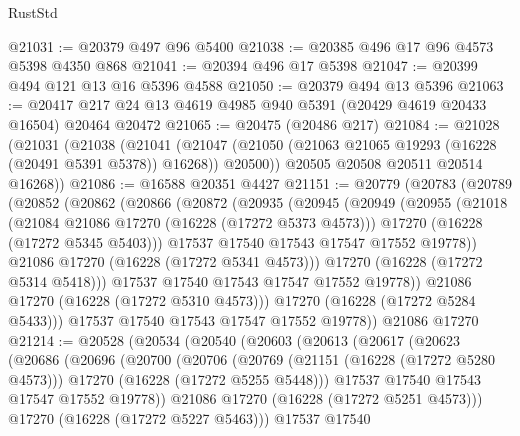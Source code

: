 \begin{lexlean}{RustStd}
\begin{coremodule}
@21031 := @20379 @497 @96 @5400
@21038 := @20385 @496 @17 @96 @4573 @5398 @4350 @868
@21041 := @20394 @496 @17 @5398
@21047 := @20399 @494 @121 @13 @16 @5396 @4588
@21050 := @20379 @494 @13 @5396
@21063 := @20417 @217 @24 @13 @4619 @4985 @940 @5391 (@20429 @4619 @20433 @16504) @20464 @20472
@21065 := @20475 (@20486 @217)
@21084 := @21028
    (@21031
      (@21038
        (@21041
          (@21047 (@21050 (@21063 @21065 @19293 (@16228 (@20491 @5391 @5378)) @16268)) @20500))
        @20505
        @20508
        @20511
        @20514
        @16268))
@21086 := @16588 @20351 @4427
@21151 := @20779
    (@20783
      (@20789
        (@20852
          (@20862
            (@20866
              (@20872
                (@20935
                  (@20945
                    (@20949
                      (@20955
                        (@21018
                          (@21084 @21086 @17270 (@16228 (@17272 @5373 @4573)))
                          @17270
                          (@16228 (@17272 @5345 @5403)))
                        @17537
                        @17540
                        @17543
                        @17547
                        @17552
                        @19778))
                    @21086
                    @17270
                    (@16228 (@17272 @5341 @4573)))
                  @17270
                  (@16228 (@17272 @5314 @5418)))
                @17537
                @17540
                @17543
                @17547
                @17552
                @19778))
            @21086
            @17270
            (@16228 (@17272 @5310 @4573)))
          @17270
          (@16228 (@17272 @5284 @5433)))
        @17537
        @17540
        @17543
        @17547
        @17552
        @19778))
    @21086
    @17270
@21214 := @20528
    (@20534
      (@20540
        (@20603
          (@20613
            (@20617
              (@20623
                (@20686
                  (@20696
                    (@20700
                      (@20706
                        (@20769
                          (@21151 (@16228 (@17272 @5280 @4573)))
                          @17270
                          (@16228 (@17272 @5255 @5448)))
                        @17537
                        @17540
                        @17543
                        @17547
                        @17552
                        @19778))
                    @21086
                    @17270
                    (@16228 (@17272 @5251 @4573)))
                  @17270
                  (@16228 (@17272 @5227 @5463)))
                @17537
                @17540

\end{coremodule}
\end{lexlean}
